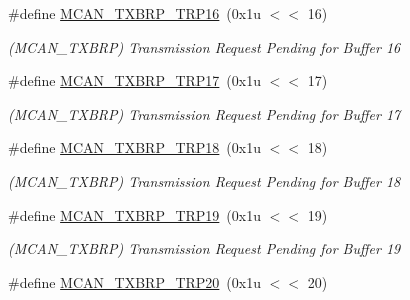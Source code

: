 \begin{DoxyCompactItemize}
\mbox{\label{group__SAMV71__MCAN_gafe3133d34827ff52644ec5bb992e6219}} 
\#define \mbox{\hyperlink{group__SAMV71__MCAN_gafe3133d34827ff52644ec5bb992e6219}{M\+C\+A\+N\+\_\+\+T\+X\+B\+R\+P\+\_\+\+T\+R\+P16}}~(0x1u $<$$<$ 16)
\begin{DoxyCompactList}\small\item\em (M\+C\+A\+N\+\_\+\+T\+X\+B\+RP) Transmission Request Pending for Buffer 16 \end{DoxyCompactList}\item 
\mbox{\label{group__SAMV71__MCAN_ga5f584fb4c2069139ec3bd70e2478e911}} 
\#define \mbox{\hyperlink{group__SAMV71__MCAN_ga5f584fb4c2069139ec3bd70e2478e911}{M\+C\+A\+N\+\_\+\+T\+X\+B\+R\+P\+\_\+\+T\+R\+P17}}~(0x1u $<$$<$ 17)
\begin{DoxyCompactList}\small\item\em (M\+C\+A\+N\+\_\+\+T\+X\+B\+RP) Transmission Request Pending for Buffer 17 \end{DoxyCompactList}\item 
\mbox{\label{group__SAMV71__MCAN_gae57de9c0dc66f788c6c94830bf57ebdb}} 
\#define \mbox{\hyperlink{group__SAMV71__MCAN_gae57de9c0dc66f788c6c94830bf57ebdb}{M\+C\+A\+N\+\_\+\+T\+X\+B\+R\+P\+\_\+\+T\+R\+P18}}~(0x1u $<$$<$ 18)
\begin{DoxyCompactList}\small\item\em (M\+C\+A\+N\+\_\+\+T\+X\+B\+RP) Transmission Request Pending for Buffer 18 \end{DoxyCompactList}\item 
\mbox{\label{group__SAMV71__MCAN_ga2939a15bbac374110a79e5e675136756}} 
\#define \mbox{\hyperlink{group__SAMV71__MCAN_ga2939a15bbac374110a79e5e675136756}{M\+C\+A\+N\+\_\+\+T\+X\+B\+R\+P\+\_\+\+T\+R\+P19}}~(0x1u $<$$<$ 19)
\begin{DoxyCompactList}\small\item\em (M\+C\+A\+N\+\_\+\+T\+X\+B\+RP) Transmission Request Pending for Buffer 19 \end{DoxyCompactList}\item 
\mbox{\label{group__SAMV71__MCAN_ga6da4bb40bb3a243edd3ae5a61916f1fc}} 
\#define \mbox{\hyperlink{group__SAMV71__MCAN_ga6da4bb40bb3a243edd3ae5a61916f1fc}{M\+C\+A\+N\+\_\+\+T\+X\+B\+R\+P\+\_\+\+T\+R\+P20}}~(0x1u $<$$<$ 20)
$$
\end{DoxyCompactItemize}
